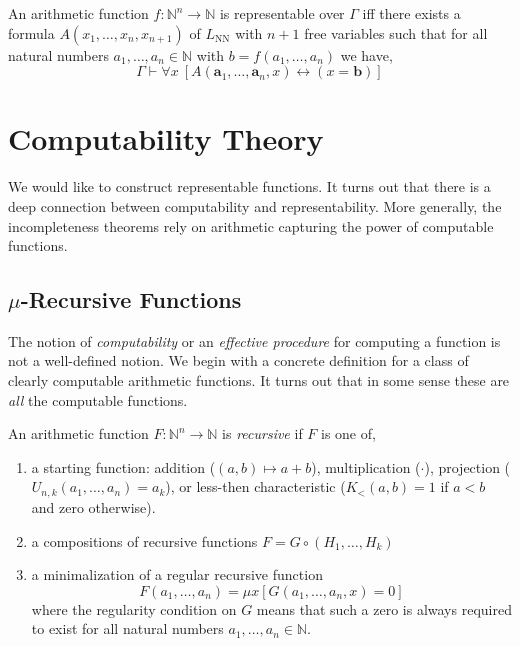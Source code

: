 \documentclass[12pt, leqno]{article}
\newcommand{\N}{\mathbb{N}}
\renewcommand{\bf}[1]{\mathbf{#1}}
\newcommand{\proves}{\vdash}
\newcommand{\uq}[1]{\forall{#1} \:}
\newenvironment{definition}[1][Definition:]{\begin{trivlist}
\item[\hskip \labelsep {\bfseries #1}]}{\end{trivlist}}
\theoremstyle{theorem}
\theoremstyle{definition}
\theoremstyle{definition}
\theoremstyle{remark}
\theoremstyle{definition}
\theoremstyle{remark}
\begin{document}
\begin{definition}
An arithmetic function $f : \N^n \to \N$ is representable over $\Gamma$ iff there exists a formula $A(x_1, \dots, x_n, x_{n+1})$ of $L_{\text{NN}}$ with $n+1$ free variables such that for all natural numbers $a_1, \dots, a_n \in \N$ with $b = f(a_1, \dots, a_n)$ we have,
\[ \Gamma \proves \uq{x} [A(\bf{a}_1, \dots, \bf{a}_n, x) \leftrightarrow (x = \bf{b})] \]
\end{definition}

\section{Computability Theory}

We would like to construct representable functions. It turns out that there is a deep connection between computability and  representability. More generally, the incompleteness theorems rely on arithmetic capturing the power of computable functions. 

\subsection{$\mu$-Recursive Functions}

The notion of \textit{computability} or an \textit{effective procedure} for computing a function is not a well-defined notion. 
We begin with a concrete definition for a class of clearly computable arithmetic functions. It turns out that in some sense these are \textit{all} the computable functions. 

\begin{definition}
An arithmetic function $F : \N^n \to \N$ is \textit{recursive} if $F$ is one of,
\begin{enumerate}
\item a starting function: addition ($(a,b) \mapsto a+b$), multiplication ($\cdot$), projection ($U_{n,k}(a_1, \dots, a_n) = a_k$), or less-then characteristic ($K_{<}(a,b) = 1$ if $a < b$ and zero otherwise).
\item a compositions of recursive functions $F = G \circ (H_1, \dots, H_k)$
\item a minimalization of a regular recursive function \[ F(a_1, \dots, a_n) = \mu x [G(a_1, \dots, a_n, x) = 0] \] where the regularity condition on $G$ means that such a zero is always required to exist for all natural numbers $a_1, \dots, a_n \in \N$. 
\end{enumerate}
\end{definition}
\end{document}
